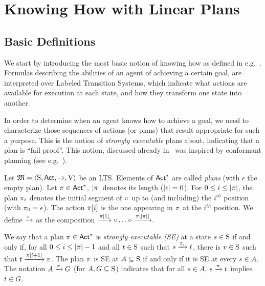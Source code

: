 \section{Knowing How with Linear Plans}
\label{sec:khlinearplans}

\subsection{Basic Definitions}

We start by introducing the most basic notion of knowing how as defined in e.g.~\cite{Wang15lori,Wang16,Wang2016}. Formulas describing the abilities of an agent of achieving a certain goal, are interpreted over Labeled Transition Systems, which indicate what actions are available for execution at each state, and how they transform one state into another.

In order to determine when an agent knows how to achieve a goal, we need to characterize those sequences of actions (or plans) that result appropriate for such a purpose. This is the notion of \emph{strongly executable} plans about, indicating that a plan is ``fail proof''. This notion, discussed already in~\cite{Wang15lori,Wang16,Wang2016} was inspired by conformant planning (see e.g.~\cite{Smith&Weld98,Bonet2010}).

\begin{definition}\label{def:plans}
    Let $\model=\tup{\S,\Act,\ra,\V}$ be an LTS. 
    Elements of $\Act^*$ are called \emph{plans} (with $\epsilon$ the empty plan).  Let $\plan\in\Act^*$, $\size{\plan}$ denotes its length ($\size{\epsilon}=0$).
    For  $0\leq i \leq \size{\plan}$, the plan $\plan_i$ denotes the initial segment of $\plan$ up to (and including) the $i^{th}$ position (with $\plan_0 = \epsilon$). The action $\plan[i]$ is the one appearing in $\plan$ at the $i^{th}$ position. We define $\reach{\plan}$ as the composition $\reach{\plan[1]} \comp \ldots \comp \reach{\plan[\size{\plan}]}$. 

    We say that a plan $\plan\in\Act^*$ is \emph{strongly executable (SE)} at a state $s\in\S$ if and only if, for all $0\leq i \leq \size{\plan}-1$ and all $t\in\S$ such that $s\reach{\plan_i} t$, there is $v\in\S$ such that $t\reach{\plan[i+1]} v$. The plan $\plan$ is SE at $A\subseteq \S$ if and only if it is SE at every $s\in A$. The notation $A \reach{\plan} G$ (for $A,G\subseteq\S$) indicates that for all $s\in A$,  $s\reach{\plan} t$ implies $t\in G$.
\end{definition}

